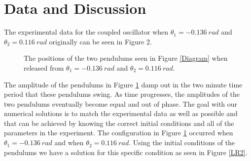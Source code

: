 \documentclass[twocolumn]{article}
\begin{document}
\section*{Data and Discussion}
The experimental data for the coupled oscillator when $\theta_{1}=-0.136 \ rad$ and $\theta_{2}=0.116 \ rad$ originally can be seen in Figure 2.
\begin{figure}[htbp]
\begin{center}
\caption{The positions of the two pendulums seen in Figure \ref{Diagram} when released from $\theta_1=-0.136 \ rad$ and $\theta_2=0.116 \ rad$.}
\label{LR1}
\end{center}
\end{figure}
\newline
The amplitude of the pendulums in Figure \ref{LR1} damp out in the two minute time period that these pendulums swing. As time progresses, the amplitudes of the two pendulums eventually become equal and out of phase. The goal with our numerical solutions is to match the experimental data as well as possible and that can be achieved by knowing the correct initial conditions and all of the parameters in the experiment. The configuration in Figure \ref{LR1} occurred when $\theta_{1}=-0.136\ rad$ and when $\theta_{2}=0.116\ rad$. Using the initial conditions of the pendulums we have a solution for this specific condition as seen in Figure \ref{LR2}.
\end{document}
